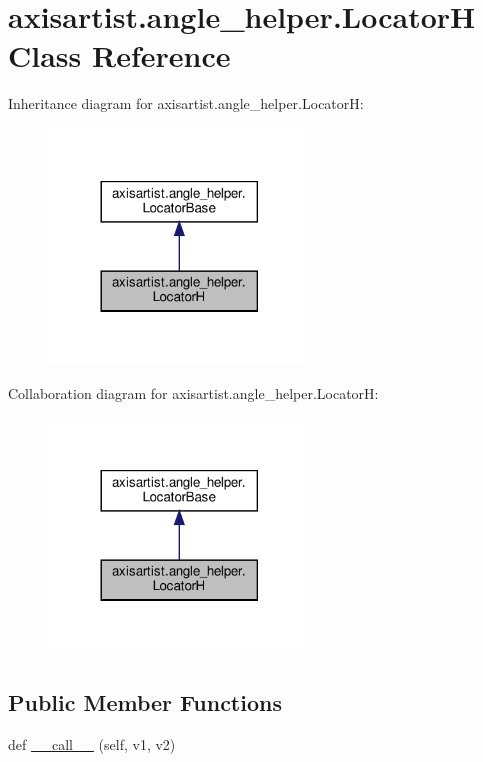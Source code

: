 \hypertarget{classaxisartist_1_1angle__helper_1_1LocatorH}{}\section{axisartist.\+angle\+\_\+helper.\+LocatorH Class Reference}
\label{classaxisartist_1_1angle__helper_1_1LocatorH}


Inheritance diagram for axisartist.\+angle\+\_\+helper.\+LocatorH\+:
\nopagebreak
\begin{figure}[H]
\begin{center}
\leavevmode
\includegraphics[width=197pt]{classaxisartist_1_1angle__helper_1_1LocatorH__inherit__graph}
\end{center}
\end{figure}


Collaboration diagram for axisartist.\+angle\+\_\+helper.\+LocatorH\+:
\nopagebreak
\begin{figure}[H]
\begin{center}
\leavevmode
\includegraphics[width=197pt]{classaxisartist_1_1angle__helper_1_1LocatorH__coll__graph}
\end{center}
\end{figure}
\subsection*{Public Member Functions}
\begin{DoxyCompactItemize}
\item 
def \hyperlink{classaxisartist_1_1angle__helper_1_1LocatorH_a543796c38ffe2a59811212c3b5c29151}{\+\_\+\+\_\+call\+\_\+\+\_\+} (self, v1, v2)
\end{DoxyCompactItemize}
